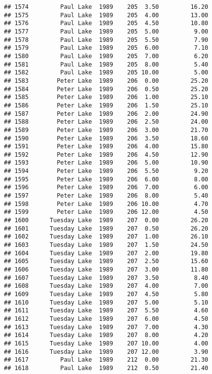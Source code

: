\documentclass[
]{article}
\begin{document}
\begin{verbatim}
## 1574         Paul Lake  1989    205  3.50         16.20
## 1575         Paul Lake  1989    205  4.00         13.00
## 1576         Paul Lake  1989    205  4.50         10.80
## 1577         Paul Lake  1989    205  5.00          9.00
## 1578         Paul Lake  1989    205  5.50          7.90
## 1579         Paul Lake  1989    205  6.00          7.10
## 1580         Paul Lake  1989    205  7.00          6.20
## 1581         Paul Lake  1989    205  8.00          5.40
## 1582         Paul Lake  1989    205 10.00          5.00
## 1583        Peter Lake  1989    206  0.00         25.20
## 1584        Peter Lake  1989    206  0.50         25.20
## 1585        Peter Lake  1989    206  1.00         25.10
## 1586        Peter Lake  1989    206  1.50         25.10
## 1587        Peter Lake  1989    206  2.00         24.90
## 1588        Peter Lake  1989    206  2.50         24.00
## 1589        Peter Lake  1989    206  3.00         21.70
## 1590        Peter Lake  1989    206  3.50         18.60
## 1591        Peter Lake  1989    206  4.00         15.80
## 1592        Peter Lake  1989    206  4.50         12.90
## 1593        Peter Lake  1989    206  5.00         10.90
## 1594        Peter Lake  1989    206  5.50          9.20
## 1595        Peter Lake  1989    206  6.00          8.00
## 1596        Peter Lake  1989    206  7.00          6.00
## 1597        Peter Lake  1989    206  8.00          5.40
## 1598        Peter Lake  1989    206 10.00          4.70
## 1599        Peter Lake  1989    206 12.00          4.50
## 1600      Tuesday Lake  1989    207  0.00         26.20
## 1601      Tuesday Lake  1989    207  0.50         26.20
## 1602      Tuesday Lake  1989    207  1.00         26.10
## 1603      Tuesday Lake  1989    207  1.50         24.50
## 1604      Tuesday Lake  1989    207  2.00         19.80
## 1605      Tuesday Lake  1989    207  2.50         15.60
## 1606      Tuesday Lake  1989    207  3.00         11.80
## 1607      Tuesday Lake  1989    207  3.50          8.40
## 1608      Tuesday Lake  1989    207  4.00          7.00
## 1609      Tuesday Lake  1989    207  4.50          5.80
## 1610      Tuesday Lake  1989    207  5.00          5.10
## 1611      Tuesday Lake  1989    207  5.50          4.60
## 1612      Tuesday Lake  1989    207  6.00          4.50
## 1613      Tuesday Lake  1989    207  7.00          4.30
## 1614      Tuesday Lake  1989    207  8.00          4.20
## 1615      Tuesday Lake  1989    207 10.00          4.00
## 1616      Tuesday Lake  1989    207 12.00          3.90
## 1617         Paul Lake  1989    212  0.00         21.30
## 1618         Paul Lake  1989    212  0.50         21.40

\end{verbatim}
\end{document}
